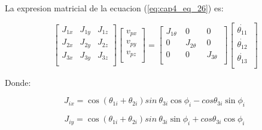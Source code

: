         La expresion matricial de la ecuacion (\ref{eq:cap4_eq_26}) es:
        
        \begin{equation}
                \left[ \begin{matrix}
                J_{1x}  &  J_{1y}  &  J_{1z}\\
                J_{2x}  &  J_{2y}  &  J_{2z}\\
                J_{3x}  &  J_{3y}  &  J_{3z}\\
                \end{matrix}
                 \right]  \left[ \begin{matrix}
                v_{px}\\
                v_{py}\\
                v_{pz}\\
                \end{matrix}
                 \right] = \left[ \begin{matrix}
                J_{1 \theta }~  &  0  &  0\\
                0  &  J_{2 \theta }~~  &  0\\
                0  &  0  &  J_{3 \theta }~\\
                \end{matrix}
                 \right]  \left[ \begin{matrix}
                \dot{ \theta _{11}}~\\
                \dot{ \theta _{12}}\\
                \dot{ \theta _{13}}~\\
                \end{matrix}
                 \right]
                \label{eq:cap4_eq_27}
        \end{equation}
        
    Donde: 
             \vspace{-1em}

    \begin{equation}
        J_{ix}=\cos  \left(  \theta _{1i}+ \theta _{2i} \right) sin~ \theta _{3i}\cos  \phi _{i}-cos  \theta _{3i}\sin  \phi _{i}~
        \label{eq:cap4_eq_28}
    \end{equation}
    \vspace{-3.5em}

    \begin{equation}
        J_{iy}=\cos  \left(  \theta _{1i}+ \theta _{2i} \right) sin~ \theta _{3i}\sin  \phi _{i}+ cos  \theta _{3i}\cos  \phi _{i}~ 
        \label{eq:cap4_eq_29}
    \end{equation}
    \vspace{-3.5em}

